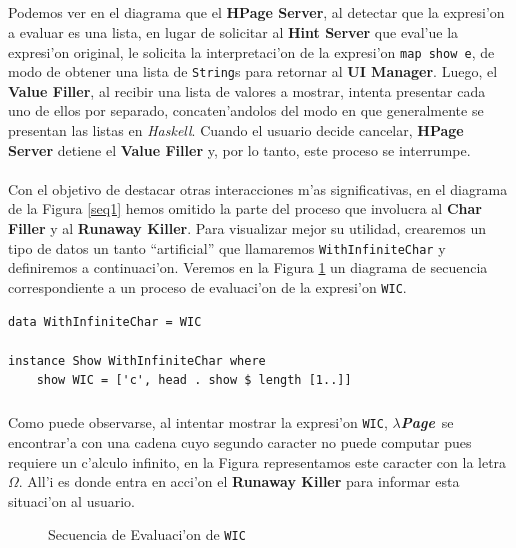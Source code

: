 \documentclass[a4paper]{article}
\newcommand{\haskell}{\textsl{Haskell}}
\newcommand{\hpage}{\textbf{\textsl{$\lambda$Page}}}
\begin{document}
\subparagraph{}Podemos ver en el diagrama que el \textbf{HPage Server}, al detectar que la expresi'on a evaluar es una lista, en lugar de solicitar al \textbf{Hint Server} que eval'ue la expresi'on original, le solicita la interpretaci'on de la expresi'on \texttt{map show e}, de modo de obtener una lista de \texttt{String}s para retornar al \textbf{UI Manager}.  Luego, el \textbf{Value Filler}, al recibir una lista de valores a mostrar, intenta presentar cada uno de ellos por separado, concaten'andolos del modo en que generalmente se presentan las listas en \haskell.  Cuando el usuario decide cancelar, \textbf{HPage Server} detiene el \textbf{Value Filler} y, por lo tanto, este proceso se interrumpe.

\paragraph{}Con el objetivo de destacar otras interacciones m'as significativas, en el diagrama de la Figura \ref{seq1} hemos omitido la parte del proceso que involucra al \textbf{Char Filler} y al \textbf{Runaway Killer}.  Para visualizar mejor su utilidad, crearemos un tipo de datos un tanto ``artificial'' que llamaremos \texttt{WithInfiniteChar} y definiremos a continuaci'on.  Veremos en la Figura \ref{seq2} un diagrama de secuencia correspondiente a un proceso de evaluaci'on de la expresi'on \texttt{WIC}.
\begin{center}\begin{lstlisting}
data WithInfiniteChar = WIC

instance Show WithInfiniteChar where
    show WIC = ['c', head . show $ length [1..]]
\end{lstlisting}\end{center}
\subparagraph{}Como puede observarse, al intentar mostrar la expresi'on \texttt{WIC}, \hpage\ se encontrar'a con una cadena cuyo segundo caracter no puede computar pues requiere un c'alculo infinito, en la Figura representamos este caracter con la letra $\Omega$. All'i es donde entra en acci'on el \textbf{Runaway Killer} para informar esta situaci'on al usuario. 

\begin{figure}[hp]
	\begin{center}
		\caption{Secuencia de Evaluaci'on de \texttt{WIC}}
		\label{seq2}
	\end{center}
\end{figure}
\end{document}
